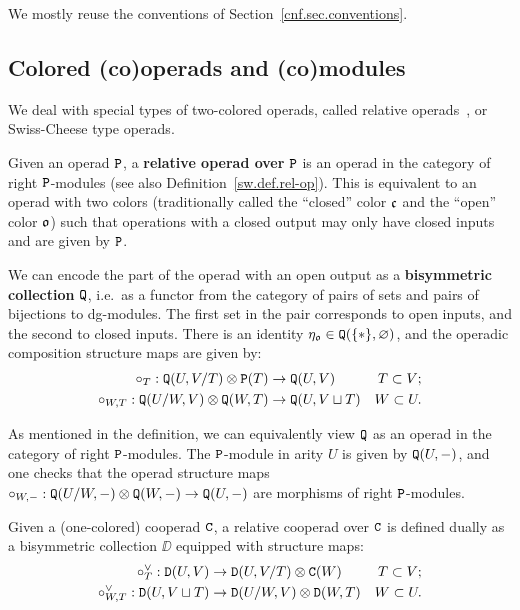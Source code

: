 We mostly reuse the conventions of Section~\ref{cnf.sec.conventions}.

\subsection{Colored {(co)}operads and {(co)}modules}
\label{cnfbnd.sec.cooperads-comodules}

We deal with special types of two-colored operads, called relative operads~\cite{Voronov1999}, or Swiss-Cheese type operads.

\begin{definition}
  Given an operad $\mathtt{P}$, a \textbf{relative operad over} $\mathtt{P}$ is an operad in the category of right $\mathtt{P}$-modules (see also Definition~\ref{sw.def.rel-op}).
  This is equivalent to an operad with two colors (traditionally called the ``closed'' color $\mathfrak{c}$ and the ``open'' color $\mathfrak{o}$) such that operations with a closed output may only have closed inputs and are given by $\mathtt{P}$.
\end{definition}

We can encode the part of the operad with an open output as a \textbf{bisymmetric collection} $\mathtt{Q}$, i.e.\ as a functor from the category of pairs of sets and pairs of bijections to dg-modules.
The first set in the pair corresponds to open inputs, and the second to closed inputs.
There is an identity $\eta_{\mathfrak{o}} \in \mathtt{Q}(\{*\}, \varnothing)$, and the operadic composition structure maps are given by:
\begin{align*}
  \circ_{T} : \mathtt{Q}(U, V/T) \otimes \mathtt{P}(T)
  & \to \mathtt{Q}(U,V)
  & T \subset V; \\
  \circ_{W,T} : \mathtt{Q}(U/W, V) \otimes \mathtt{Q}(W,T)
  & \to \mathtt{Q}(U, V \sqcup T)
  & W \subset U.
\end{align*}

As mentioned in the definition, we can equivalently view $\mathtt{Q}$ as an operad in the category of right $\mathtt{P}$-modules.
The $\mathtt{P}$-module in arity $U$ is given by $\mathtt{Q}(U, -)$, and one checks that the operad structure maps $\circ_{W, -} : \mathtt{Q}(U/W, -) \otimes \mathtt{Q}(W, -) \to \mathtt{Q}(U, -)$ are morphisms of right $\mathtt{P}$-modules.

Given a (one-colored) cooperad $\mathtt{C}$, a relative cooperad over $\mathtt{C}$ is defined dually as a bisymmetric collection $\DD$ equipped with structure maps:
\begin{align}
  \circ^{\vee}_{T} : \mathtt{D}(U,V)
  & \to \mathtt{D}(U, V/T) \otimes \mathtt{C}(W)
  & T \subset V; \\
  \circ^{\vee}_{W,T} : \mathtt{D}(U, V \sqcup T)
  & \to \mathtt{D}(U/W, V) \otimes \mathtt{D}(W, T)
  & W \subset U.
\end{align}

